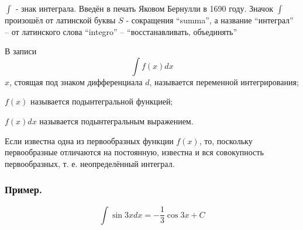 $\int$ - знак интеграла. Введён в печать Яковом Бернулли в 1690 году. Значок $\int$ произошёл от латинской буквы $S$ - сокращения ``summa'', а название ``интеграл'' -- от латинского слова ``integro'' -- ``восстанавливать, объединять''

В записи $$\int f(x) dx$$
$x$, стоящая под знаком дифференциала $d$, называется переменной интегрирования;

$f(x)$ называется подынтегральной функцией;

$f(x)dx$ называется подынтегральным выражением.


Если известна одна из первообразных функции $f(x)$, то, поскольку первообразные отличаются на постоянную, известна и вся совокупность первообразных, т. е. неопределённый интеграл.

\subsubsection{Пример.}

$$\int \sin 3x dx=-\frac{1}{3} \cos 3x +C$$

